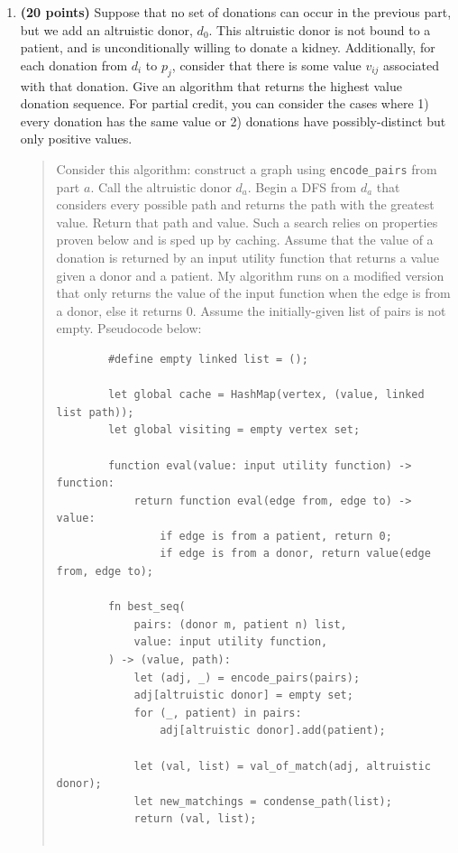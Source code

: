 \documentclass[11pt]{article}
\begin{document}
\begin{enumerate}
\begin{enumerate}
\begin{quote}
      \end{quote}
    \item {\bf (20 points)} Suppose that no set of donations can occur in the previous part, but we add an altruistic donor, $d_0$. This altruistic donor is not bound to a patient, and is unconditionally willing to donate a kidney. Additionally, for each donation from $d_i$ to $p_j$, consider that there is some value $v_{ij}$ associated with that donation. Give an algorithm that returns the highest value donation sequence. For partial credit, you can consider the cases where 1) every donation has the same value or 2) donations have possibly-distinct but only positive values. 
      \begin{quote}
        \color{purple}
        Consider this algorithm: construct a graph using \texttt{encode\_pairs} from part $a$. Call the altruistic donor $d_a$. Begin a DFS from $d_a$ that considers every possible path and returns the path with the greatest value. Return that path and value. Such a search relies on properties proven below and is sped up by caching. Assume that the value of a donation is returned by an input utility function that returns a value given a donor and a patient. My algorithm runs on a modified version that only returns the value of the input function when the edge is from a donor, else it returns 0. Assume the initially-given list of pairs is not empty. Pseudocode below: 
        \begin{verbatim}
        #define empty linked list = ();

        let global cache = HashMap(vertex, (value, linked list path));
        let global visiting = empty vertex set;

        function eval(value: input utility function) -> function:
            return function eval(edge from, edge to) -> value:
                if edge is from a patient, return 0;
                if edge is from a donor, return value(edge from, edge to);

        fn best_seq(
            pairs: (donor m, patient n) list,
            value: input utility function,
        ) -> (value, path):
            let (adj, _) = encode_pairs(pairs);
            adj[altruistic donor] = empty set;
            for (_, patient) in pairs:
                adj[altruistic donor].add(patient);

            let (val, list) = val_of_match(adj, altruistic donor);
            let new_matchings = condense_path(list);
            return (val, list);


\end{verbatim}
\end{quote}
\end{enumerate}
\end{enumerate}
\end{document}
